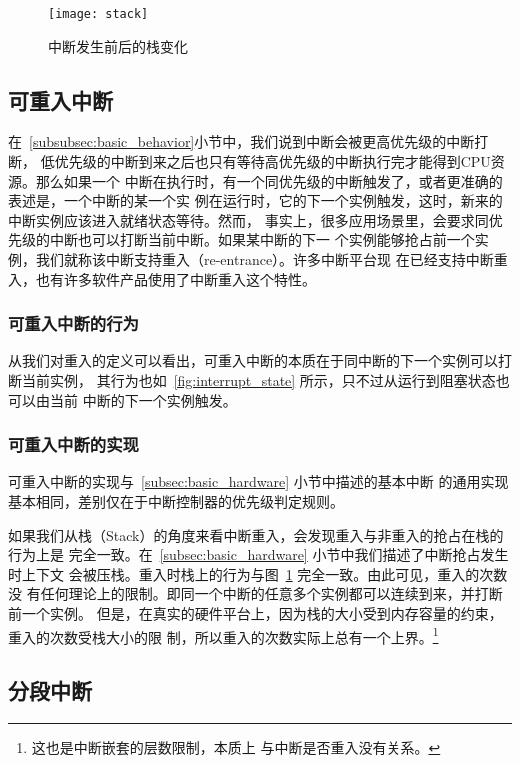 \begin{figure}[H]
	\centering
	\texttt{[image: stack]}
	\caption{中断发生前后的栈变化}
	\label{fig:stack}
\end{figure}

\subsection{可重入中断}
\label{subsec:reentrant}

在~\ref{subsubsec:basic_behavior}小节中，我们说到中断会被更高优先级的中断打断，
低优先级的中断到来之后也只有等待高优先级的中断执行完才能得到CPU资源。那么如果一个
中断在执行时，有一个同优先级的中断触发了，或者更准确的表述是，一个中断的某一个实
例在运行时，它的下一个实例触发，这时，新来的中断实例应该进入就绪状态等待。然而，
事实上，很多应用场景里，会要求同优先级的中断也可以打断当前中断。如果某中断的下一
个实例能够抢占前一个实例，我们就称该中断支持重入（re-entrance）。许多中断平台现
在已经支持中断重入，也有许多软件产品使用了中断重入这个特性。

\subsubsection{可重入中断的行为}
\label{subsubsec:reentrant_behavior}

从我们对重入的定义可以看出，可重入中断的本质在于同中断的下一个实例可以打断当前实例， 
其行为也如~\ref{fig:interrupt_state} 所示，只不过从运行到阻塞状态也可以由当前
中断的下一个实例触发。

\subsubsection{可重入中断的实现}
\label{subsec:reentrant_hardware}

可重入中断的实现与~\ref{subsec:basic_hardware} 小节中描述的基本中断
的通用实现基本相同，差别仅在于中断控制器的优先级判定规则。

如果我们从栈（Stack）的角度来看中断重入，会发现重入与非重入的抢占在栈的行为上是
完全一致。在~\ref{subsec:basic_hardware} 小节中我们描述了中断抢占发生时上下文
会被压栈。重入时栈上的行为与图~\ref{fig:stack} 完全一致。由此可见，重入的次数没
有任何理论上的限制。即同一个中断的任意多个实例都可以连续到来，并打断前一个实例。
但是，在真实的硬件平台上，因为栈的大小受到内存容量的约束，重入的次数受栈大小的限
制，所以重入的次数实际上总有一个上界。\footnote{这也是中断嵌套的层数限制，本质上
与中断是否重入没有关系。}

\subsection{分段中断}
\label{subsec:segment}

